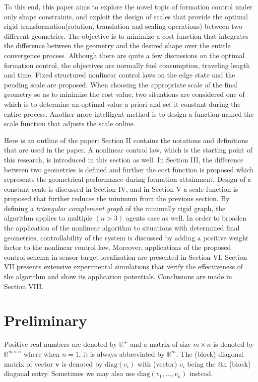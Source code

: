 \documentclass[times]{rncauth}
\begin{document}
To this end, this paper aims to explore the novel topic of formation
control under only shape constraints, and exploit the design of
scales that provide the optimal rigid transformation(rotation, translation and scaling operations) between two different geometries. The objective is to minimize  a cost function that integrates the difference between the geometry and the desired shape over the entitle convergence process.
Although there are quite a few discussions on the optimal formation
control, the objectives are normally  fuel
consumption\cite{Kim09pathplanning}, traveling length and
time\cite{Tillerson02}. Fixed structured nonlinear control laws on the
edge state and the pending scale are proposed. When choosing the
appropriate scale of the final geometry so as to minimize the cost
value, two situations are considered one of which is to determine an
optimal value a priori and set it constant during the entire
process. Another more intelligent method is to design a function
named the scale function that adjusts the scale online.

Here is an outline of the paper: Section II contains the notations
and definitions that are used in the paper. A nonlinear control law,
which is the starting point of this research, is introduced in this
section as well. In Section III, the difference between two geometries is defined and
further the cost function is proposed which represents the geometrical performance during formation attainment.
Design of a constant  scale is discussed in Section IV, and in Section V a scale function is  proposed that  further reduces the minimum from the
previous section. By defining a \emph{triangular complement graph}
of the minimally rigid graph, the algorithm applies to multiple
$(n>3)$ agents case as well. In order to broaden the application of
the nonlinear algorithm to situations with determined final
geometries, controllability of the system is discussed by adding a
positive weight factor to the nonlinear control law. Moreover,
applications of the proposed control schema in sensor-target
localization are presented in Section VI. Section VII presents
extensive experimental simulations that verify the effectiveness of
the algorithm and show its application potentials. Conclusions are
made in Section VIII.

\vspace{-6pt}

\section{Preliminary}
\vspace{-2pt}
 Positive real numbers are denoted by $\mathbb{R}^+$
and a matrix of size $m\times n$ is denoted by $\mathbb{R}^{m\times
n}$ where when $n=1$, it is always abbreviated by $\mathbb{R}^m$.
The (block) diagonal matrix of vector $\mathbf{v}$ is denoted by
$\text{diag}(v_i)$ with (vector) $v_i$ being the $i$th (block)
diagonal entry. Sometimes we may also use
$\text{diag}(v_1,\ldots,v_n)$ instead.
\end{document}
